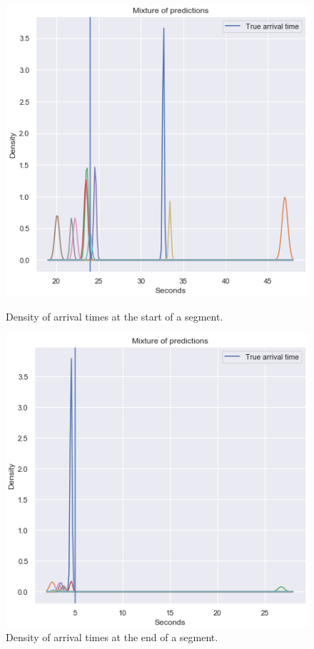 \begin{figure}[H]
  \begin{minipage}{.46\textwidth}
    \includegraphics[width=\textwidth]{figures/mixture-start-of-traj.png}
    \caption{Density of arrival times at the start of a segment.}
    \label{fig:mixture-start-of-traj}
  \end{minipage}
  \hspace{5pt}
  \begin{minipage}{.46\textwidth}
    \includegraphics[width=\textwidth]{figures/mixture-end-of-traj.png}
    \caption{Density of arrival times at the end of a segment.}
    \label{fig:mixture-end-of-traj}
  \end{minipage}
\end{figure}
